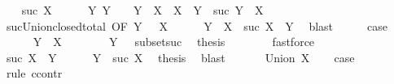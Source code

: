 \begin{isabellebody}
\ \ \isamarkupfalse%
\ {\isacharparenleft}{\kern0pt}suc\ X{\isacharparenright}{\kern0pt}\isanewline
\ \ \isamarkupfalse%
\ {\isacharasterisk}{\kern0pt}\ {\isacharequal}{\kern0pt}\ {\isacartoucheopen}{\isasymAnd}Y{\isachardot}{\kern0pt}\ Y\ {\isasymin}\ {\isasymC}\ {\isasymLongrightarrow}\ Y\ {\isasymsubseteq}\ X\ {\isasymLongrightarrow}\ X\ {\isacharequal}{\kern0pt}\ Y\ {\isasymor}\ suc\ Y\ {\isasymsubseteq}\ X{\isacartoucheclose}\isanewline
\ \ \isamarkupfalse%
\ suc{\isacharunderscore}{\kern0pt}Union{\isacharunderscore}{\kern0pt}closed{\isacharunderscore}{\kern0pt}total{\isacharprime}{\kern0pt}\ {\isacharbrackleft}{\kern0pt}OF\ {\isacartoucheopen}Y\ {\isasymin}\ {\isasymC}{\isacartoucheclose}\ {\isacartoucheopen}X\ {\isasymin}\ {\isasymC}{\isacartoucheclose}{\isacharbrackright}{\kern0pt}\isanewline
\ \ \isamarkupfalse%
\ {\isachardoublequoteopen}Y\ {\isasymsubseteq}\ X\ {\isasymor}\ suc\ X\ {\isasymsubseteq}\ Y{\isachardoublequoteclose}\ \isamarkupfalse%
\ blast\isanewline
\ \ \isamarkupfalse%
\ \isamarkupfalse%
\ {\isacharquery}{\kern0pt}case\isanewline
\ \ \isamarkupfalse%
\isanewline
\ \ \ \ \isamarkupfalse%
\ {\isachardoublequoteopen}Y\ {\isasymsubseteq}\ X{\isachardoublequoteclose}\isanewline
\ \ \ \ \isamarkupfalse%
\ {\isacharasterisk}{\kern0pt}\ \ {\isacartoucheopen}Y\ {\isasymin}\ {\isasymC}{\isacartoucheclose}\ subset{\isacharunderscore}{\kern0pt}suc\ \isamarkupfalse%
\ {\isacharquery}{\kern0pt}thesis\isanewline
\ \ \ \ \ \ \isamarkupfalse%
\ fastforce\isanewline
\ \ \isamarkupfalse%
\isanewline
\ \ \ \ \isamarkupfalse%
\ {\isachardoublequoteopen}suc\ X\ {\isasymsubseteq}\ Y{\isachardoublequoteclose}\isanewline
\ \ \ \ \isamarkupfalse%
\ {\isacartoucheopen}Y\ {\isasymsubseteq}\ suc\ X{\isacartoucheclose}\ \isamarkupfalse%
\ {\isacharquery}{\kern0pt}thesis\ \isamarkupfalse%
\ blast\isanewline
\ \ \isamarkupfalse%
\isanewline
{}\isamarkupfalse%
\isanewline
\ \ \isamarkupfalse%
\ {\isacharparenleft}{\kern0pt}Union\ X{\isacharparenright}{\kern0pt}\isanewline
\ \ \isamarkupfalse%
\ {\isacharquery}{\kern0pt}case\isanewline
\ \ \isamarkupfalse%
\ {\isacharparenleft}{\kern0pt}rule\ ccontr{\isacharparenright}{\kern0pt}\isanewline
\ \ \ \ \isamarkupfalse%

\end{isabellebody}

